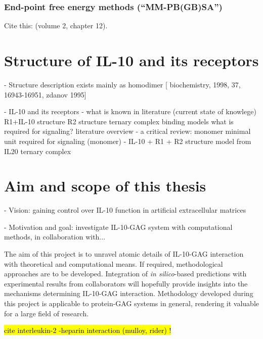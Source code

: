 \lipsum[1-5]

\subsubsection{End-point free energy methods (\enquote{MM-PB(GB)SA})}
\label{methods:mmpbsa_mmgbsa}


Cite this: \cite{schlick_innovationsdynamics_2012} (volume 2, chapter 12).

\lipsum[1-5]

\section{Structure of IL-10 and its receptors}

    - Structure description
        exists mainly as homodimer [
            biochemistry, 1998, 37, 16943-16951, zdanov 1995]


    - IL-10 and its receptors
        - what is known in literature (current state of knowlege)
            R1+IL-10 structure
            R2 structure
            ternary complex binding models
            what is required for signaling? literature overview
        - a critical review: monomer
            minimal unit required for signaling (monomer)
        - IL-10 + R1 + R2 structure model from IL20 ternary complex


\section{Aim and scope of this thesis}

- Vision: gaining control over IL-10 function in artificial extracellular matrices

- Motivation and goal: investigate IL-10-GAG system with computational
      methods, in collaboration with...

The aim of this project is to unravel atomic details of IL-10-GAG interaction
with theoretical and computational means. If required, methodological approaches
are to be developed. Integration of \textit{in silico}-based predictions with
experimental results from collaborators will hopefully provide insights into the
mechanisms determining IL-10-GAG interaction. Methodology developed during this
project is applicable to protein-GAG systems in general, rendering it valuable
for a large field of research.



\hl{cite interleukin-2 -heparin interaction (mulloy, rider) !}

\lipsum[1-5]





